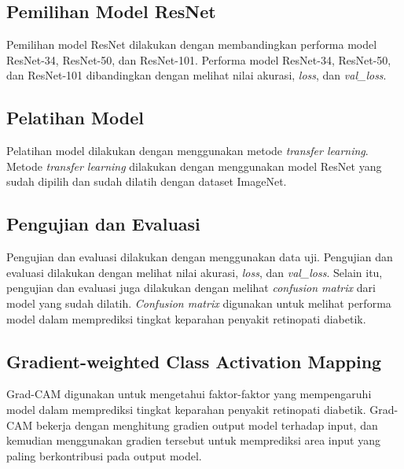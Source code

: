 \subsection{Pemilihan Model ResNet}
Pemilihan model ResNet dilakukan dengan membandingkan performa model ResNet-34, ResNet-50, dan ResNet-101. Performa model ResNet-34, ResNet-50, dan ResNet-101 dibandingkan dengan melihat nilai akurasi, \emph{loss}, dan \emph{val\_loss}.

\subsection{Pelatihan Model}
Pelatihan model dilakukan dengan menggunakan metode \emph{transfer learning}. Metode \emph{transfer learning} dilakukan dengan menggunakan model ResNet yang sudah dipilih dan sudah dilatih dengan dataset ImageNet.

\subsection{Pengujian dan Evaluasi}
Pengujian dan evaluasi dilakukan dengan menggunakan data uji. Pengujian dan evaluasi dilakukan dengan melihat nilai akurasi, \emph{loss}, dan \emph{val\_loss}. Selain itu, pengujian dan evaluasi juga dilakukan dengan melihat \emph{confusion matrix} dari model yang sudah dilatih. \emph{Confusion matrix} digunakan untuk melihat performa model dalam memprediksi tingkat keparahan penyakit retinopati diabetik.

\subsection{Gradient-weighted Class Activation Mapping}
Grad-CAM digunakan untuk mengetahui faktor-faktor yang mempengaruhi model dalam memprediksi tingkat keparahan penyakit retinopati diabetik. Grad-CAM bekerja dengan menghitung gradien output model terhadap input, dan kemudian menggunakan gradien tersebut untuk memprediksi area input yang paling berkontribusi pada output model.
